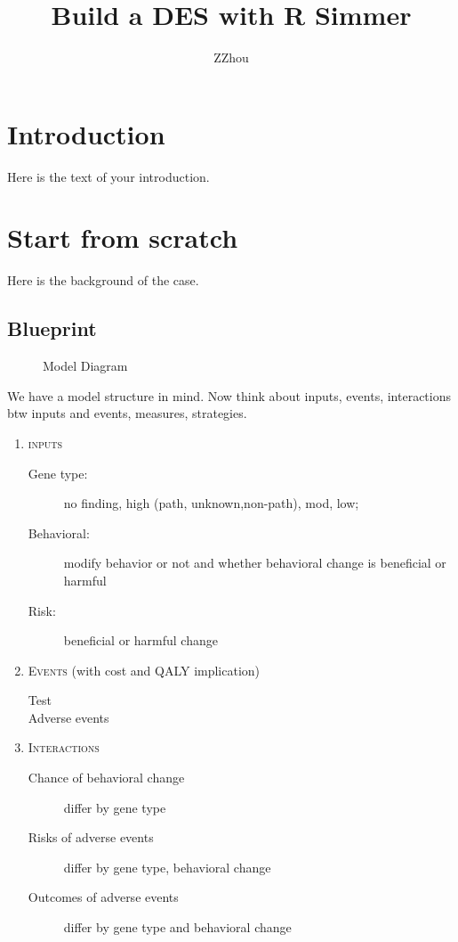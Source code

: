 \documentclass{article}
\begin{document}
\title{Build a DES with R Simmer}
\author{ZZhou}

\maketitle

\section{Introduction}
Here is the text of your introduction.
\pagebreak

\section{Start from scratch}
Here is the background of the case.
\pagebreak

\subsection{Blueprint}
\begin{figure}
\centering
  \caption{Model Diagram}
  \label{simulationfigure}
\end{figure}


We have a model structure in mind. Now think about inputs, events, interactions btw inputs and events, measures, strategies. 

\begin{enumerate}

\item
\textsc{inputs} 
\begin{description} 
\item[Gene type:] no finding, high (path, unknown,non-path), mod, low;
\item[Behavioral:] modify behavior or not and whether behavioral change is beneficial or harmful
\item[Risk:] beneficial or harmful change
\end{description}

\item
\textsc{Events} (with cost and QALY implication)  
\begin{description} 
\item[Test]
\item[Adverse events]
\end{description}

\item
\textsc{Interactions}
\begin{description} 
\item[Chance of behavioral change] differ by gene type
\item[Risks of adverse events] differ by gene type, behavioral change
\item[Outcomes of adverse events] differ by gene type and behavioral change
\end{description}

\end{enumerate}
\pagebreak
\end{document}
